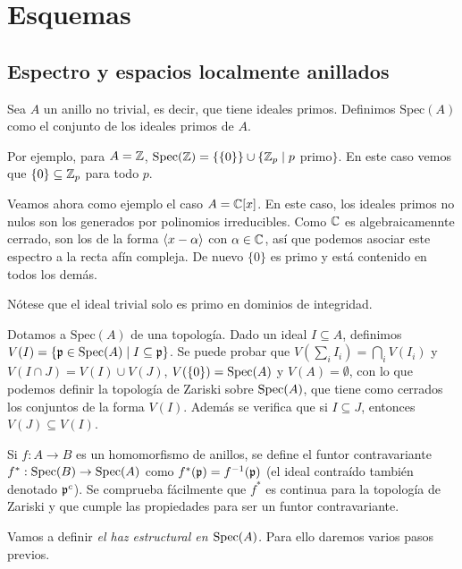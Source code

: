 \documentclass[GA.tex]{subfiles}
\begin{document}

\chapter{Esquemas}

\section{Espectro y espacios localmente anillados}

\begin{defi}
Sea $A$ un anillo no trivial, es decir, que tiene ideales primos. Definimos $\mathrm{Spec}(A)$ como el conjunto de los ideales primos de $A$. 
\end{defi}

Por ejemplo, para $A=\mathbb{Z}$, $\mathrm{Spec}(\mathbb{Z})=\{\{0\}\}\cup\{\mathbb{Z}_p\mid p$ primo$\}$. En este caso vemos que $\{0\}\subseteq\mathbb{Z}_p$ para todo $p$. 

Veamos ahora como ejemplo el caso $A=\mathbb{C}[x]$. En este caso, los ideales primos no nulos son los generados por polinomios irreducibles. Como $\mathbb{C}$ es algebraicamennte cerrado, son los de la forma $\langle{x-\alpha}\rangle$ con $\alpha\in\mathbb{C}$, así que podemos asociar este espectro a la recta afín compleja. De nuevo $\{0\}$ es primo y está contenido en todos los demás. 

Nótese que el ideal trivial solo es primo en dominios de integridad.

Dotamos a $\mathrm{Spec}(A)$ de una topología. Dado un ideal $I\subseteq A$, definimos $V(I)=\{{\mathfrak{p}}\in\operatorname{Spec}(A)\mid I\subseteq{\mathfrak{p}}\}$. Se puede probar que $V(\sum_i I_i)=\bigcap_i V(I_i)$ y $V(I\cap J)=V(I)\cup V(J)$, $V(\{0\})=\operatorname{Spec}(A)$ y $V(A)=\emptyset$, con lo que podemos definir la topología de Zariski sobre $\operatorname{Spec}(A)$, que tiene como cerrados los conjuntos de la forma $V(I)$. Además se verifica que si $I\subseteq J$, entonces $V(J)\subseteq V(I)$. 

Si $f:A\to B$ es un homomorfismo de anillos, se define el funtor contravariante $f^*:\operatorname{Spec}(B)\to\operatorname{Spec}(A)$ como $f^*({\mathfrak{p}})=f^{-1}({\mathfrak{p}})$ (el ideal contraído también denotado ${\mathfrak{p}}^c$). Se comprueba fácilmente que $f^*$ es continua para la topología de Zariski y que cumple las propiedades para ser un funtor contravariante. 

Vamos a definir \emph{el haz estructural en $\operatorname{Spec}(A)$.} Para ello daremos varios pasos previos.
\end{document}
